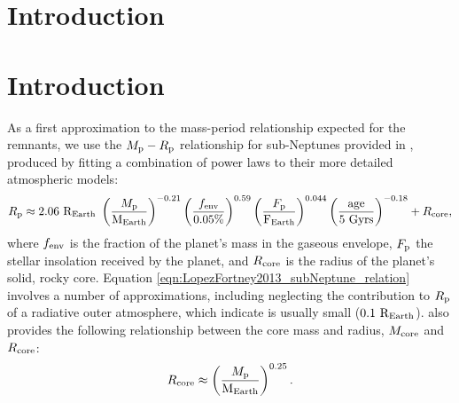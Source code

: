 \documentclass[smallcondensed]{svjour3}    %
\begin{document}
\section{Introduction}
\label{sec:introduction}

\section{Introduction}

As a first approximation to the mass-period relationship expected for the remnants, we use the $M_{\rm p}-R_{\rm p}$ relationship for sub-Neptunes provided in \cite{}, produced by fitting a combination of power laws to their more detailed atmospheric models:
\begin{equation}
R_{\rm p} \approx 2.06\ {\rm R_{Earth}}\ \left( \dfrac{M_{\rm p}}{\rm M_{Earth}} \right)^{-0.21} \left( \dfrac{f_{\rm env}}{0.05\%} \right)^{0.59} \left( \dfrac{F_{\rm p}}{\rm F_{Earth}} \right)^{0.044} \left( \dfrac{\rm age}{\rm 5\ Gyrs} \right)^{-0.18} + R_{\rm core},
\label{eqn:LopezFortney2013_subNeptune_relation}
\end{equation}
where $f_{\rm env}$ is the fraction of the planet's mass in the gaseous envelope, $F_{\rm p}$ the stellar insolation received by the planet, and $R_{\rm core}$ is the radius of the planet's solid, rocky core. Equation \ref{eqn:LopezFortney2013_subNeptune_relation} involves a number of approximations, including neglecting the contribution to $R_{\rm p}$ of a radiative outer atmosphere, which \cite{} indicate is usually small ($0.1\ {\rm R_{Earth}}$). \cite{} also provides the following relationship between the core mass and radius, $M_{\rm core}$ and $R_{\rm core}$:
\begin{equation}
R_{\rm core} \approx \left( \dfrac{M_{\rm p}}{\rm M_{Earth}} \right)^{0.25}.
\label{eqn:LopezFortney2013_core_relation}
\end{equation}





\end{document}
